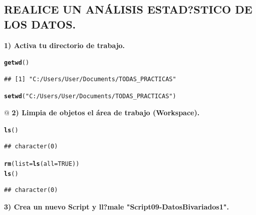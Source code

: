 \documentclass[12pt,letterpaper]{article}\usepackage[]{graphicx}\usepackage[]{color}
\makeatletter
\newcommand{\hlnum}[1]{\textcolor[rgb]{0.686,0.059,0.569}{#1}}%
\newcommand{\hlstr}[1]{\textcolor[rgb]{0.192,0.494,0.8}{#1}}%
\newcommand{\hlstd}[1]{\textcolor[rgb]{0.345,0.345,0.345}{#1}}%
\newcommand{\hlkwc}[1]{\textcolor[rgb]{0.333,0.667,0.333}{#1}}%
\newcommand{\hlkwd}[1]{\textcolor[rgb]{0.737,0.353,0.396}{\textbf{#1}}}%
\newenvironment{kframe}{%
 \def\at@end@of@kframe{}%
 \ifinner\ifhmode%
  \def\at@end@of@kframe{\end{minipage}}%
  \begin{minipage}{\columnwidth}%
 \fi\fi%
 \def\FrameCommand##1{\hskip\@totalleftmargin \hskip-\fboxsep
 \colorbox{shadecolor}{##1}\hskip-\fboxsep
     \hskip-\linewidth \hskip-\@totalleftmargin \hskip\columnwidth}%
 \MakeFramed {\advance\hsize-\width
   \@totalleftmargin\z@ \linewidth\hsize
   \@setminipage}}%
 {\par\unskip\endMakeFramed%
 \at@end@of@kframe}
\newenvironment{knitrout}{}{} %
\makeatother
\begin{document}
\subsection{REALICE UN AN\'ALISIS ESTAD?STICO DE LOS DATOS.} 

\textbf{1) Activa tu directorio de trabajo.} 
\begin{knitrout}
\color{fgcolor}\begin{kframe}
\begin{alltt}
\hlkwd{getwd}\hlstd{()}
\end{alltt}
\begin{verbatim}
## [1] "C:/Users/User/Documents/TODAS_PRACTICAS"
\end{verbatim}
\begin{alltt}
\hlkwd{setwd}\hlstd{(}\hlstr{"C:/Users/User/Documents/TODAS_PRACTICAS"}\hlstd{)}
\end{alltt}
\end{kframe}
\end{knitrout}
@
\textbf{2) Limpia de objetos el \'area de trabajo (Workspace).} 
\begin{knitrout}
\color{fgcolor}\begin{kframe}
\begin{alltt}
\hlkwd{ls}\hlstd{()}
\end{alltt}
\begin{verbatim}
## character(0)
\end{verbatim}
\begin{alltt}
\hlkwd{rm}\hlstd{(}\hlkwc{list}\hlstd{=}\hlkwd{ls}\hlstd{(}\hlkwc{all}\hlstd{=}\hlnum{TRUE}\hlstd{))}
\hlkwd{ls}\hlstd{()}
\end{alltt}
\begin{verbatim}
## character(0)
\end{verbatim}
\end{kframe}
\end{knitrout}
\textbf{3) Crea un nuevo Script y ll?male "Script09-DatosBivariados1".}
\end{document}
